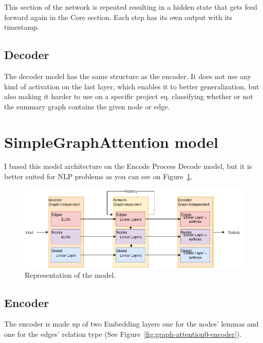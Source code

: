 This section of the network is repeated resulting in a hidden state that gets feed forward again in the Core section. Each step has its own output with its timestamp.

\subsection{Decoder}
The decoder model has the same structure as the encoder. It does not use any kind of activation on the last layer, which enables it to better generalization, but also making it harder to use on a specific project eq. classifying whether or not the summary graph contains the given node or edge.

\section{SimpleGraphAttention model}
I based this model architecture on the Encode Process Decode model, but it is better suited for NLP problems as you can see on Figure~\ref{fig:graph-attention0}.

\begin{figure}[!ht]
	\centering
	\includegraphics[width=150mm, keepaspectratio]{figures/GA0.png}
	\caption{Representation of the model.}
	\label{fig:graph-attention0}
\end{figure}

\subsection{Encoder}

The encoder is made up of two Embedding layers one for the nodes' lemmas and one for the edges' relation type (See Figure~\ref{fig:graph-attention0-encoder}). 

